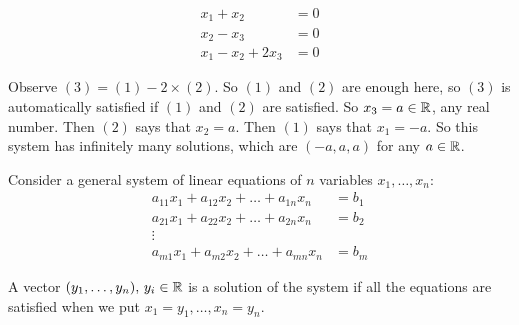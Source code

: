 \documentclass[10pt]{scrartcl}
\begin{document}
\begin{example}
\begin{align*}
  x_1 + x_2 &= 0 \tag{1}\\
  x_2 - x_3 &= 0 \tag{2}\\
  x_1 - x_2 + 2x_3 &= 0\tag{3}
\end{align*}

Observe $(3) = (1) - 2\times(2)$. So $(1)$ and $(2)$ are enough here, so $(3)$ is automatically satisfied if $(1)$ and $(2)$ are satisfied. So $x_3 = a \in\mathbb{R}$, any real number. Then $(2)$ says that $x_2 = a$. Then $(1)$ says that $x_1 = -a$. So this system has infinitely many solutions, which are $(-a,a,a)$ for any $a\in\mathbb{R}$. 
\end{example}\vspace*{5pt}

Consider a general system of linear equations of $n$ variables $x_1,\dots,x_n$: 
\begin{align*}
  a_{11}x_1 + a_{12}x_2 +\dots + a_{1n}x_n &= b_1\\
  a_{21}x_1 + a_{22}x_2 + \dots + a_{2n}x_n &= b_2\\
  \vdots\\
  a_{m1}x_1  + a_{m2}x_2 + \dots + a_{mn}x_n &= b_m
\end{align*}

A vector $(y_1,\dots,y_n),\, y_i \in\mathbb{R}$ is a solution of the system if all the equations are satisfied when we put $x_1 = y_1,\dots,x_n = y_n$.

\vspace*{10pt}
\end{document}
